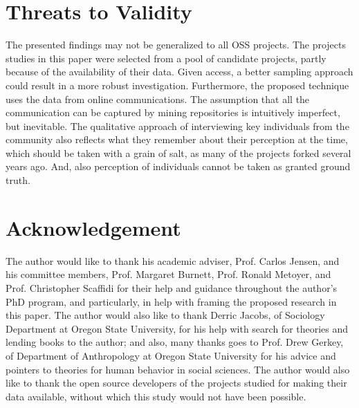 \documentclass{acm_proc_article-sp}
\begin{document}
\section{Threats to Validity}
The presented findings may not be generalized to all OSS projects. The projects studies in this paper were selected from a pool of candidate projects, partly because of the availability of their data. Given access, a better sampling approach could result in a more robust investigation. Furthermore, the proposed technique uses the data from online communications. The assumption that all the communication can be captured by mining repositories is intuitively imperfect, but inevitable. 
The qualitative approach of interviewing key individuals from the community also reflects what they remember about their perception at the time, which should be taken with a grain of salt, as many of the projects forked several years ago. And, also perception of individuals cannot be taken as granted ground truth. 


\section*{Acknowledgement}
\label{acknowledgements}
The author would like to thank his academic adviser, Prof. Carlos Jensen, and his committee members, Prof. Margaret Burnett, Prof. Ronald Metoyer, and Prof. Christopher Scaffidi for their help and guidance throughout the author's PhD program, and particularly, in help with framing the proposed research in this paper. The author would also like to thank Derric Jacobs, of Sociology Department at Oregon State University, for his help with search for theories and lending books to the author; and also, many thanks goes to Prof. Drew Gerkey, of Department of Anthropology at Oregon State University for his advice and pointers to theories for human behavior in social sciences.
The author would also like to thank the open source developers of the projects studied for making their data available, without which this study would not have been possible. \\

%


  

%
%
\end{document}
